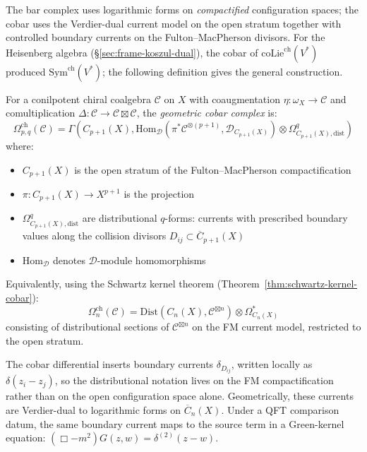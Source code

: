 \begin{definition}\label{def:geom-cobar}
The bar complex uses logarithmic forms on \emph{compactified}
configuration spaces; the cobar uses the Verdier-dual current model on
the open stratum together with controlled boundary currents on the
Fulton--MacPherson divisors. For the Heisenberg algebra
(\S\ref{sec:frame-koszul-dual}), the cobar of
$\mathrm{coLie}^{\mathrm{ch}}(V^*)$ produced
$\mathrm{Sym}^{\mathrm{ch}}(V^*)$; the following definition gives the
general construction.

For a conilpotent chiral coalgebra $\mathcal{C}$ on $X$ with coaugmentation
$\eta: \omega_X \to \mathcal{C}$ and comultiplication $\Delta: \mathcal{C} \to
\mathcal{C} \boxtimes \mathcal{C}$, the \emph{geometric cobar complex} is:
\[
\Omega^{\text{ch}}_{p,q}(\mathcal{C}) = \Gamma\left(C_{p+1}(X), \text{Hom}_{\mathcal{D}}(\pi^*\mathcal{C}^{\otimes(p+1)}, \mathcal{D}_{C_{p+1}(X)}) \otimes \Omega^q_{C_{p+1}(X),\text{dist}}\right)
\]
where:
\begin{itemize}
\item $C_{p+1}(X)$ is the open stratum of the
Fulton--MacPherson compactification
\item $\pi: C_{p+1}(X) \to X^{p+1}$ is the projection
\item $\Omega^q_{C_{p+1}(X),\text{dist}}$ are distributional $q$-forms: currents with
prescribed boundary values along the collision divisors
$D_{ij}\subset\overline{C}_{p+1}(X)$
\item $\text{Hom}_{\mathcal{D}}$ denotes $\mathcal{D}$-module homomorphisms
\end{itemize}

Equivalently, using the Schwartz kernel theorem (Theorem~\ref{thm:schwartz-kernel-cobar}):
\[\Omega^{\text{ch}}_n(\mathcal{C}) = \text{Dist}\left(C_n(X), \mathcal{C}^{\boxtimes n}\right)
\otimes \Omega^*_{C_n(X)}\]
consisting of distributional sections of $\mathcal{C}^{\boxtimes n}$
on the FM current model, restricted to the open stratum.
\end{definition}

\begin{remark}[Distributions]\label{rem:why-distributions}
The cobar differential inserts boundary currents
$\delta_{D_{ij}}$, written locally as $\delta(z_i-z_j)$, so the
distributional notation lives on the FM compactification rather than on
the open configuration space alone. Geometrically, these currents are
Verdier-dual to logarithmic forms on $\overline{C}_n(X)$. Under a QFT
comparison datum, the same boundary current maps to the source term in
a Green-kernel equation:
$(\Box - m^2)G(z,w)=\delta^{(2)}(z-w)$.
\end{remark}


